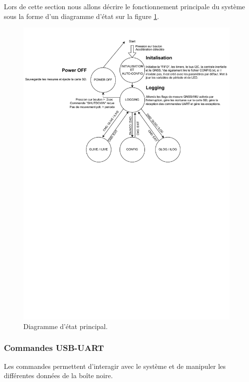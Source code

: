 Lors de cette section nous allons décrire le fonctionnement principale du système sous la forme d'un diagramme d'état sur la figure \ref{fig:stateapp}.

\begin{figure}[h]
	\centering
	\includegraphics[width=1\linewidth]{../figures/code/diagrammes/state_app}
	\caption{Diagramme d'état principal.}
	\label{fig:stateapp}
\end{figure}

\subsubsection{Commandes USB-UART}
Les commandes permettent d'interagir avec le système et de manipuler les différentes données de la boîte noire.

